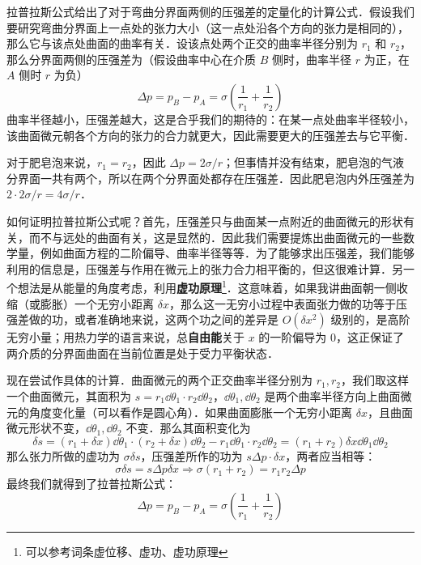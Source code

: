 拉普拉斯公式给出了对于弯曲分界面两侧的压强差的定量化的计算公式．假设我们要研究弯曲分界面上一点处的张力大小（这一点处沿各个方向的张力是相同的），那么它与该点处曲面的曲率有关．设该点处两个正交的曲率半径分别为 $r_1$ 和 $r_2$，那么分界面两侧的压强差为（假设曲率中心在介质 $B$ 侧时，曲率半径 $r$ 为正，在 $A$ 侧时 $r$ 为负）
\begin{equation}
\Delta p=p_B-p_A=\sigma(\frac{1}{r_1}+\frac{1}{r_2})
\end{equation}
曲率半径越小，压强差越大，这是合乎我们的期待的：在某一点处曲率半径较小，该曲面微元朝各个方向的张力的合力就更大，因此需要更大的压强差去与它平衡．

对于肥皂泡来说，$r_1=r_2$，因此 $\Delta p=2\sigma/r$；但事情并没有结束，肥皂泡的气液分界面一共有两个，所以在两个分界面处都存在压强差．因此肥皂泡内外压强差为 $2\cdot 2\sigma/r=4\sigma/r$．

如何证明拉普拉斯公式呢？首先，压强差只与曲面某一点附近的曲面微元的形状有关，而不与远处的曲面有关，这是显然的．因此我们需要提炼出曲面微元的一些数学量，例如曲面方程的二阶偏导、曲率半径等等．为了能够求出压强差，我们能够利用的信息是，压强差与作用在微元上的张力合力相平衡的，但这很难计算．另一个想法是从能量的角度考虑，利用\textbf{虚功原理}\footnote{可以参考词条虚位移、虚功、虚功原理}．这意味着，如果我讲曲面朝一侧收缩（或膨胀）一个无穷小距离 $\delta x$，那么这一无穷小过程中表面张力做的功等于压强差做的功，或者准确地来说，这两个功之间的差异是 $O(\delta x^2)$ 级别的，是高阶无穷小量；用热力学的语言来说，总\textbf{自由能}关于 $x$ 的一阶偏导为 $0$，这正保证了两介质的分界面曲面在当前位置是处于受力平衡状态．

现在尝试作具体的计算．曲面微元的两个正交曲率半径分别为 $r_1,r_2$，我们取这样一个曲面微元，其面积为 $s=r_1 \dd \theta_1 \cdot r_2 \dd \theta_2$，$\dd\theta_1,\dd\theta_2$ 是两个曲率半径方向上曲面微元的角度变化量（可以看作是圆心角）．如果曲面膨胀一个无穷小距离 $\delta x$，且曲面微元形状不变，$\dd \theta_1,\dd \theta_2$ 不变．那么其面积变化为
\begin{equation}
\delta s=(r_1+\delta x)\dd \theta_1\cdot 
(r_2+\delta x)\dd \theta_2 - r_1 \dd \theta_1 \cdot r_2 \dd \theta_2=(r_1+r_2)\delta x \dd \theta_1\dd \theta_2
\end{equation}
那么张力所做的虚功为 $\sigma \delta s$，压强差所作的功为 $s\Delta p \cdot \delta x$，两者应当相等：
\begin{equation}
\sigma\delta s=s\Delta p \delta x\Rightarrow \sigma(r_1+r_2)=r_1r_2\Delta p
\end{equation}
最终我们就得到了拉普拉斯公式：
\begin{equation}
\Delta p=p_B-p_A=\sigma(\frac{1}{r_1}+\frac{1}{r_2})
\end{equation}


